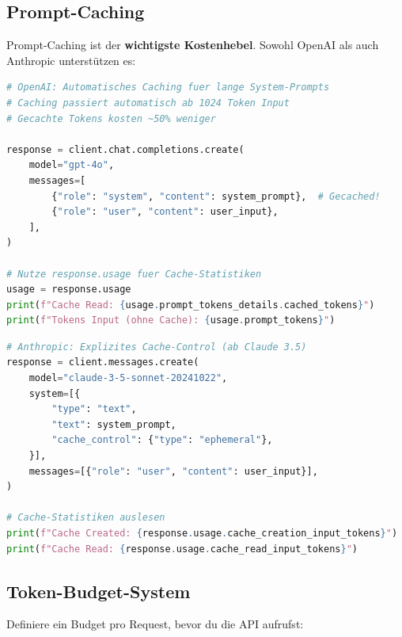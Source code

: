 \subsection{Prompt-Caching}

Prompt-Caching ist der \textbf{wichtigste Kostenhebel}. Sowohl OpenAI als auch Anthropic unterstützen es:

\begin{lstlisting}[language=Python, caption=Prompt-Caching mit OpenAI]
# OpenAI: Automatisches Caching fuer lange System-Prompts
# Caching passiert automatisch ab 1024 Token Input
# Gecachte Tokens kosten ~50% weniger

response = client.chat.completions.create(
    model="gpt-4o",
    messages=[
        {"role": "system", "content": system_prompt},  # Gecached!
        {"role": "user", "content": user_input},
    ],
)

# Nutze response.usage fuer Cache-Statistiken
usage = response.usage
print(f"Cache Read: {usage.prompt_tokens_details.cached_tokens}")
print(f"Tokens Input (ohne Cache): {usage.prompt_tokens}")
\end{lstlisting}

\begin{lstlisting}[language=Python, caption=Prompt-Caching mit Anthropic]
# Anthropic: Explizites Cache-Control (ab Claude 3.5)
response = client.messages.create(
    model="claude-3-5-sonnet-20241022",
    system=[{
        "type": "text",
        "text": system_prompt,
        "cache_control": {"type": "ephemeral"},
    }],
    messages=[{"role": "user", "content": user_input}],
)

# Cache-Statistiken auslesen
print(f"Cache Created: {response.usage.cache_creation_input_tokens}")
print(f"Cache Read: {response.usage.cache_read_input_tokens}")
\end{lstlisting}

\subsection{Token-Budget-System}

Definiere ein Budget pro Request, bevor du die API aufrufst:

